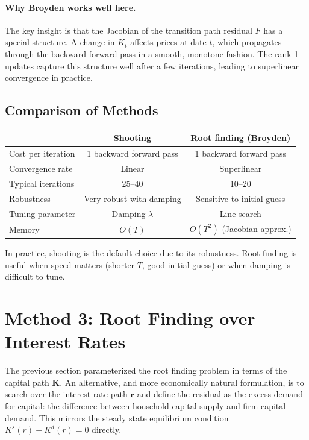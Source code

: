 \documentclass[12pt]{article}
\begin{document}
\paragraph{Why Broyden works well here.} The key insight is that the Jacobian of the transition path residual $F$ has a special structure. A change in $K_t$ affects prices at date $t$, which propagates through the backward forward pass in a smooth, monotone fashion. The rank 1 updates capture this structure well after a few iterations, leading to superlinear convergence in practice.

\subsection{Comparison of Methods}

\begin{center}
\begin{tabular}{lcc}
\toprule
& \textbf{Shooting} & \textbf{Root finding (Broyden)} \\
\midrule
Cost per iteration & 1 backward forward pass & 1 backward forward pass \\
Convergence rate & Linear & Superlinear \\
Typical iterations & 25--40 & 10--20 \\
Robustness & Very robust with damping & Sensitive to initial guess \\
Tuning parameter & Damping $\lambda$ & Line search \\
Memory & $O(T)$ & $O(T^2)$ (Jacobian approx.) \\
\bottomrule
\end{tabular}
\end{center}

In practice, shooting is the default choice due to its robustness. Root finding is useful when speed matters (shorter $T$, good initial guess) or when damping is difficult to tune.

\section{Method 3: Root Finding over Interest Rates}
\label{sec:root_finding_r}

The previous section parameterized the root finding problem in terms of the capital path $\mathbf{K}$. An alternative, and more economically natural formulation, is to search over the interest rate path $\mathbf{r}$ and define the residual as the excess demand for capital: the difference between household capital supply and firm capital demand. This mirrors the steady state equilibrium condition $K^s(r) - K^d(r) = 0$ directly.
\end{document}
